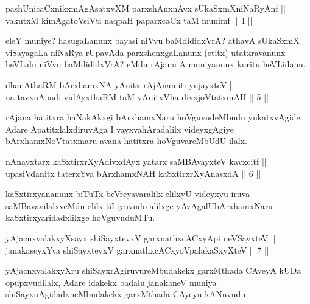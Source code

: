 \begin{shl}
pashUnicaCxnikxmAgAsatxvXM parxshAnxnAvx sUkaSxmXniNaRyAnf || \\
vakutxM kimAgatoV\s siVti naqpaH paparxcaCx taM munimf \hfill ||  4 ||  
\end{shl}

\begin{artha}
eleY muniye? hasugaLanunx bayasi niVvu baMdididxVrA? athavA sUkaSxmX viSayagaLa niNaRya rUpavAda parxshenxgaLanunx (etitx) utatxravanunx heVLalu niVvu baMdididxVrA? eMdu rAjanu A muniyanunx kuritu heVLidanu.
\end{artha}


\begin{shl}
dhanAthaRM bArxhamxNA yAnitx rAjAnamiti yujayxteV || \\
na tavxnApadi vidAyxthaRM taM yAnitxVha divxjoVtatxmAH \hfill ||  5 ||  
\end{shl}

\begin{artha}
rAjana hatitxra haNakAkxgi bArxhamxNaru hoVguvudeMbudu yukatxvAgide. Adare ApatitxlalxdiruvAga I vayxvahAradalilx videyxgAgiye bArxhamxNoVtatxmaru avana hatitxra hoVguvareMbUdU ilalx.
\end{artha}

\begin{shl}
nAnayxtarx kaSxtirxrXyAdivxdAyx yatarx saMBAvayxteV kavxcitf || \\
upasiVdanitx taterxYva bArxhamxNAH kaSxtirxrXyAnasxdA \hfill ||  6 ||  
\end{shl}

\begin{artha}
kaSxtirxyananunx biTuTx beVreyavaralilx elilxyU videyxyu iruva saMBavavilalxveMdu elilx tiLiyuvudo alilxge yAvAgalU\break bArxhamxNaru kaSxtirxyaridadxlilxge hoVguvuduMTu.
\end{artha}


\begin{shl}
yAjacnxvalakxyXsayx shiSayxtevxV garxnathxcACxyA\s pi neVSayxteV || \\
janakaseyxYva shiSayxtevxV garxnathxcACxyoVpalakaSxyXteV \hfill ||  7 ||  
\end{shl}

\begin{artha}
yAjacnxvalakxyXru shiSayxrAgiruvureMbudakekx garxMthada CAyeyA kUDa opupxvudilalx, Adare idakekx badalu janakaneV muniya shiSayxnAgidadxneMbudakekx garxMthada CAyeyu kANuvudu.
\end{artha}

